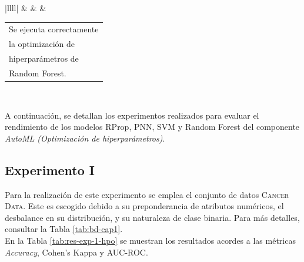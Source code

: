 \begin{table}[H]
\begin{spacing}{1.15}
{\begin{tabular}{|llll|}
			                                                                 &  &  & \begin{tabular}[c]{@{}l@{}}Se ejecuta correctamente \\ la optimización de \\ hiperparámetros de \\ Random Forest.\end{tabular} \\ \hline
		\end{tabular}%
	}
		\end{spacing}
\end{table}

A continuación, se detallan los experimentos realizados para evaluar el rendimiento de los modelos RProp, PNN, SVM y Random Forest del componente \textit{AutoML (Optimización de hiperparámetros)}.

\subsection{Experimento I}
Para la realización de este experimento se emplea el conjunto de datos \textsc{Cancer Data}. Este es escogido debido a su preponderancia de atributos numéricos, el desbalance en su distribución, y su naturaleza de clase binaria. Para más detalles, consultar la Tabla \ref{tab:bd-cap1}. \\
En la Tabla \ref{tab:res-exp-1-hpo} se muestran los resultados acordes a las métricas \textit{Accuracy}, Cohen’s Kappa y AUC-ROC.



